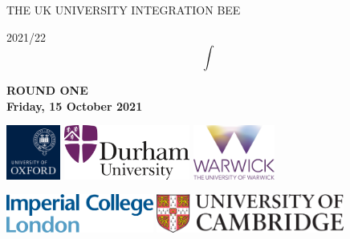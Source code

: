 \documentclass[11pt, a4paper]{article}
\begin{document}
    

\thispagestyle{empty}

\begin{center}
    \Huge\textsc{THE UK UNIVERSITY INTEGRATION BEE}

    \Huge 2021/22
    $$
    \int
    $$
\end{center}

\vspace{0.8in}

\begin{center}
    \Huge\sffamily\textbf{ROUND ONE}\\
    \LARGE\textbf{Friday, 15 October 2021}
\end{center}

\vspace{0.7in}

\begin{center}
    \begin{adjustwidth}{2cm}{2cm}

\includegraphics[height=0.7in]{oxford-logo}
\hfill
\includegraphics[height=0.7in]{durham-logo}
\hfill
\includegraphics[height=0.7in]{warwick-logo}


\vspace{0.2in}

\includegraphics[height=0.5in]{imperial-logo}
\hfill
\includegraphics[height=0.5in]{cambridge-logo}

\end{adjustwidth}
\end{center}
\end{document}
